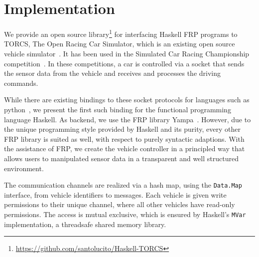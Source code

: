 \section{Implementation}

We provide an open source library\footnote{\url{https://github.com/santolucito/Haskell-TORCS}} for interfacing Haskell FRP programs to TORCS, The Open Racing Car Simulator, which is an existing open source vehicle simulator~\cite{torcs}.
It has been used in the Simulated Car Racing Championship competition~\cite{SCRC}.
In these competitions, a car is controlled via a socket that sends the sensor data from the vehicle and receives and processes the driving commands.

While there are existing bindings to these socket protocols for languages such as python~\cite{snakeoil,pyscrc}, we present the first such binding for the functional programming language Haskell. 
As backend, we use the FRP library Yampa~\cite{yampa}. 
However, due to the unique programming style provided by Haskell and its purity, every other FRP library is suited as well, with respect to purely syntactic adaptions.
With the assistance of FRP, we create the  vehicle controller in a principled way that allows users to manipulated sensor data in a transparent and well structured environment.



The communication channels are realized via a hash map, using the \texttt{Data.Map} interface, from vehicle identifiers to messages.
Each vehicle is given write permissions to their unique channel, where all other vehicles have read-only permissions.
The access is mutual exclusive, which is ensured by Haskell's \texttt{MVar} implementation, a threadsafe shared memory library. %
